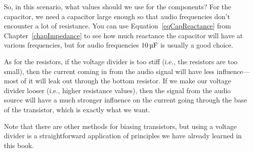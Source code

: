 So, in this scenario, what values should we use for the components?
For the capacitor, we need a capacitor large enough so that audio frequencies don't encounter a lot of resistance.
You can use Equation~\ref{eqCapReactance} from Chapter~\ref{chapImpedance} to see how much reactance the capacitor will have at various frequencies, but for audio frequencies $10\,\si{\micro\farad}$ is usually a good choice.

As for the resistors, if the voltage divider is too stiff (i.e., the resistors are too small), then the current coming in from the audio signal will have less influence---most of it will leak out through the bottom resistor.
If we make our voltage divider looser (i.e., higher resistance values), then the signal from the audio source will have a much stronger influence on the current going through the base of the transistor, which is exactly what we want.




Note that there are other methods for biasing transistors, but using a voltage divider is a straightforward application of principles we have already learned in this book.
